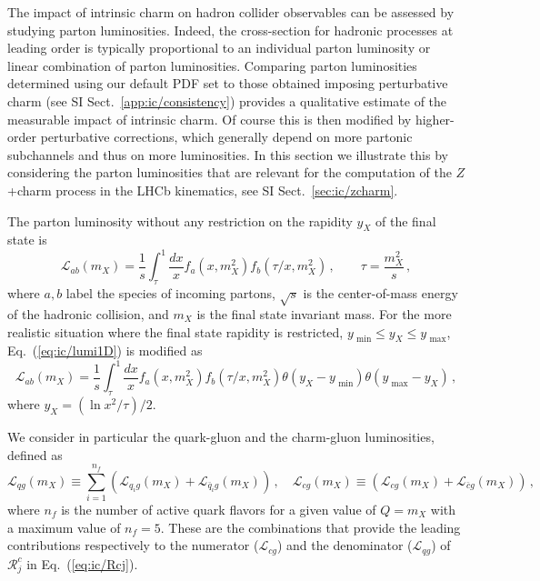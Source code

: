 The impact of intrinsic charm on hadron collider observables can be
assessed by studying  parton luminosities. Indeed, the
cross-section for hadronic processes at leading order is typically
proportional to an individual parton luminosity or linear combination
of parton luminosities.
%
Comparing parton luminosities determined
using our default PDF set to those obtained imposing perturbative
charm (see SI Sect.~\ref{app:ic/consistency}) provides a qualitative estimate of the
measurable impact of intrinsic charm. Of course this is then modified
by higher-order
perturbative corrections, which generally depend on more partonic
subchannels and thus on more luminosities.
%
In this section we illustrate this by considering the parton
luminosities that are relevant for the computation of the
$Z$+charm process in the LHCb kinematics, see SI Sect.~\ref{sec:ic/zcharm}.

The parton luminosity without any restriction on the rapidity $y_X$ of the final state is
\begin{equation}
\label{eq:ic/lumi1D}
\mathcal{L}_{ab}(m_X)= \frac{1}{s}\int_{\tau}^1 \frac{dx}{x}f_a \left( x,m_X^2\right)
f_b\left( \tau/x,m_X^2\right) \, ,\qquad
\tau=\frac{m_X^2}{s} \, ,
\end{equation}
where $a,b$ label the species of incoming partons, $\sqrt{s}$ is the center-of-mass energy of
the hadronic collision, and $m_X$ is the final state invariant mass.
%
For the more realistic situation where the final state rapidity
is restricted, $y_\textrm{ min}\le y_X\le y_\textrm{ max}$,
Eq.~(\ref{eq:ic/lumi1D}) is modified as
\begin{equation}
\label{eq:ic/lumi1D_restricted}
\mathcal{L}_{ab}(m_X)= \frac{1}{s}\int_{\tau}^1 \frac{dx}{x}f_a \left( x,m_X^2\right)
f_b\left( \tau/x,m_X^2\right) \theta\left( y_X-y_\textrm{ min}  \right)
\theta\left( y_\textrm{ max}-y_X  \right)\, , 
\end{equation}
where $y_X = \left( \ln x^2/\tau \right) /2$.

We consider in particular the quark-gluon and the charm-gluon luminosities, defined as
\begin{equation}
\label{eq:ic/lumis}
\mathcal{L}_{qg}(m_X)\equiv \sum_{i=1}^{n_f} \left( \mathcal{L}_{q_ig}(m_X)+
\mathcal{L}_{\bar{q}_ig}(m_X) \right)\, , \quad
\mathcal{L}_{cg}(m_X)\equiv  \left( \mathcal{L}_{cg}(m_X)+
\mathcal{L}_{\bar{c}g}(m_X) \right)\, , 
\end{equation}
where $n_f$ is the number of active quark flavors for a given value of $Q=m_X$
with a maximum value of $n_f=5$.
%
These are the combinations that provide the leading contributions
respectively to the numerator ($\mathcal{L}_{cg}$) and the 
denominator
($\mathcal{L}_{qg}$) of  $\mathcal{R}_j^c$ in Eq.~(\ref{eq:ic/Rcj}). 

